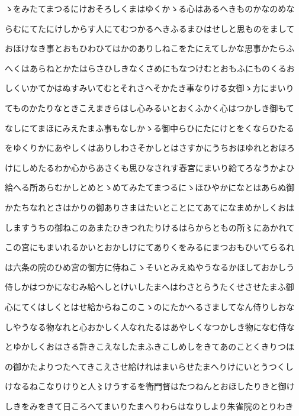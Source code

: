 \documentclass[a4paper,11pt,landscape]{ltjtarticle}
\begin{document}
\par\medskip
ゝをみたてまつるにけおそろしくまはゆくかゝる心はあるへきものかなのめな
\par\medskip
らむにてたにけしからす人にてむつかるへきふるまひはせしと思ものをまして
\par\medskip
おほけなき事とおもひわひてはかのありしねこをたにえてしかな思事かたらふ
\par\medskip
へくはあらねとかたはらさひしきなくさめにもなつけむとおもふにものくるお
\par\medskip
しくいかてかはぬすみいてむとそれさへそかたき事なりける女御ゝ方にまいり
\par\medskip
てものかたりなときこえまきらはし心みるいとおくふかく心はつかしき御もて
\par\medskip
なしにてまほにみえたまふ事もなしかゝる御中らひにたにけとをくならひたる
\par\medskip
をゆくりかにあやしくはありしわさそかしとはさすかにうちおほゆれとおほろ
\par\medskip
けにしめたるわか心からあさくも思ひなされす春宮にまいり給てろなうかよひ
\par\medskip
給へる所あらむかしとめとゝめてみたてまつるにゝほひやかになとはあらぬ御
\par\medskip
かたちなれとさはかりの御ありさまはたいとことにてあてになまめかしくおは
\par\medskip
しますうちの御ねこのあまたひきつれたりけるはらからともの所〻にあかれて
\par\medskip
この宮にもまいれるかいとおかしけにてありくをみるにまつおもひいてらるれ
\par\medskip
は六条の院のひめ宮の御方に侍ねこゝそいとみえぬやうなるかほしておかしう
\par\medskip
侍しかはつかになむみ給へしとけいしたまへはわさとらうたくせさせたまふ御
\par\medskip
心にてくはしくとはせ給からねこのこゝのにたかへるさましてなん侍りしおな
\par\medskip
しやうなる物なれと心おかしく人なれたるはあやしくなつかしき物になむ侍な
\par\medskip
とゆかしくおほさる許きこえなしたまふきこしめしをきてあのことくきりつほ
\par\medskip
の御かたよりつたへてきこえさせ給けれはまいらせたまへりけにいとうつくし
\par\medskip
けなるねこなりけりと人〻けうするを衛門督はたつねんとおほしたりきと御け
\par\medskip
しきをみをきて日ころへてまいりたまへりわらはなりしより朱雀院のとりわき
\end{document}
